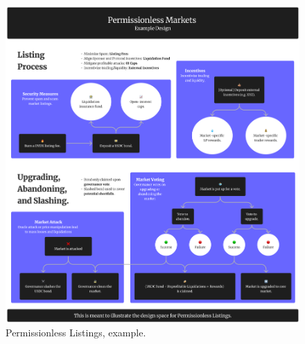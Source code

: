         \begin{figure}[htp]
            \centering
            \includegraphics[width=0.95\linewidth]{figs/Permissionless Market Listings.png}
            \captionsetup[]{width=0.95\linewidth}
            \caption{Permissionless Listings, example.}
            \label{fig:permlistings}
        \end{figure}